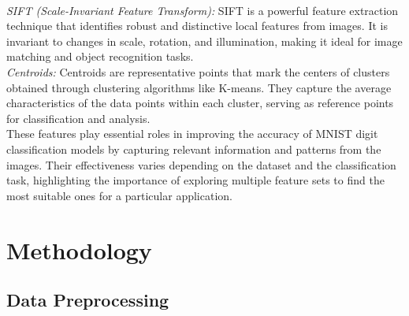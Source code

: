 \documentclass{article}
\begin{document}
\\
\emph{SIFT (Scale-Invariant Feature Transform):} SIFT is a powerful feature extraction technique that identifies robust and distinctive local features from images. It is invariant to changes in scale, rotation, and illumination, making it ideal for image matching and object recognition tasks. 
\\
\emph{Centroids:} Centroids are representative points that mark the centers of clusters obtained through clustering algorithms like K-means. They capture the average characteristics of the data points within each cluster, serving as reference points for classification and analysis.
\\
These features play essential roles in improving the accuracy of MNIST digit classification models by capturing relevant information and patterns from the images. Their effectiveness varies depending on the dataset and the classification task, highlighting the importance of exploring multiple feature sets to find the most suitable ones for a particular application.

\section{Methodology}

\subsection{Data Preprocessing}
\end{document}
